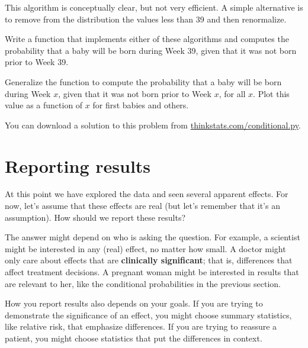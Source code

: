 \documentclass[12pt]{book}
\begin{document}
This algorithm is conceptually clear, but not very efficient.
A simple alternative is to remove from the distribution the values
less than 39 and then renormalize.

\begin{ex}

Write a function that implements either of these algorithms and
computes the probability that a baby will be born during Week 39,
given that it was not born prior to Week 39.

Generalize the function to compute the
probability that a baby will be born during Week $x$, given that
it was not born prior to Week $x$, for all $x$.
Plot this value as a function of $x$ for first babies and others.

You can download a solution to this problem from
\url{thinkstats.com/conditional.py}.


\end{ex}


\section{Reporting results}

At this point we have explored the data and seen several apparent
effects.  For now, let's assume that these effects are real (but let's
remember that it's an assumption).  How should we report these
results?

The answer might depend on who is asking the question.  For example, a
scientist might be interested in any (real) effect, no matter how
small.  A doctor might only care about effects that are {\bf
  clinically significant}; that is, differences that affect treatment
decisions.  A pregnant woman might be interested in results that are
relevant to her, like the conditional probabilities in the previous
section.


How you report results also depends on your goals.  If you are
trying to demonstrate the significance of an effect, you might choose
summary statistics, like relative risk, that emphasize differences.
If you are trying to reassure a patient, you might choose statistics
that put the differences in context.
\end{document}
